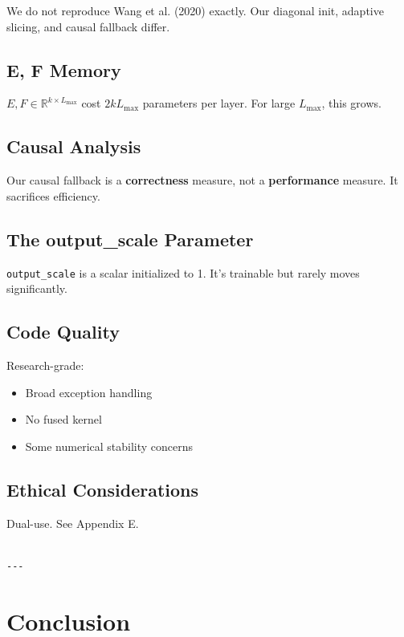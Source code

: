 We do not reproduce Wang et al. (2020) exactly. Our diagonal init, adaptive 
slicing, and causal fallback differ.

\subsection{E, F Memory}

$E, F \in \mathbb{R}^{k \times L_\text{max}}$ cost $2 k L_\text{max}$ 
parameters per layer. For large $L_\text{max}$, this grows.

\subsection{Causal Analysis}

Our causal fallback is a \textbf{correctness} measure, not a \textbf{performance} 
measure. It sacrifices efficiency.

\subsection{The output\_scale Parameter}

\texttt{output\_scale} is a scalar initialized to 1. It's trainable but rarely 
moves significantly.

\subsection{Code Quality}

Research-grade:
\begin{itemize}
\item Broad exception handling
\item No fused kernel
\item Some numerical stability concerns

\end{itemize}
\subsection{Ethical Considerations}

Dual-use. See Appendix E.
\begin{lstlisting}

---
\end{lstlisting}

\section{Conclusion}

